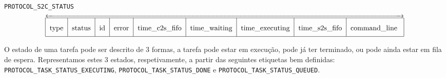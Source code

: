\documentclass[12pt, a4paper, titlepage]{article}
\begin{document}
    \begin{adjustwidth}{-1in}{-1in}
    \begin{center}
        \abovedisplayskip=-1pt
        \texttt{PROTOCOL\_S2C\_STATUS}
        $$\overleftrightarrow{
            \begin{tabular}{|c|c|c|c|c|c|c|c|c|}
                \hline
                    type &
                    status &
                    id &
                    error &
                    time\_c2s\_fifo &
                    time\_waiting &
                    time\_executing &
                    time\_s2s\_fifo &
                    command\_line
                    \rule[-2ex]{0pt}{6ex}\\
                \hline
            \end{tabular}
        }$$
    \end{center}
    \end{adjustwidth}

    O estado de uma tarefa pode ser descrito de 3 formas, a tarefa pode estar em execução, pode já
    ter terminado, ou pode ainda estar em fila de espera. Representamos estes 3 estados,
    respetivamente, a partir das seguintes etiquetas bem definidas:
    \texttt{PROTOCOL\_TASK\_STATUS\_EXECUTING}, \texttt{PROTOCOL\_TASK\_STATUS\_DONE} e
    \texttt{PROTOCOL\_TASK\_STATUS\_QUEUED}.
\end{document}
